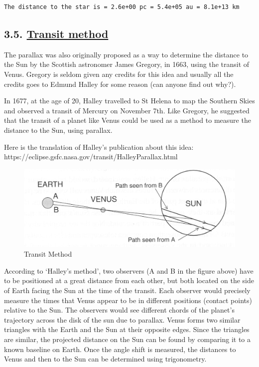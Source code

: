 \documentclass[
  letterpaper,
  DIV=11,
  numbers=noendperiod]{scrartcl}
\begin{document}
\begin{verbatim}
The distance to the star is = 2.6e+00 pc = 5.4e+05 au = 8.1e+13 km
\end{verbatim}

\hypertarget{transit-method}{%
\subsection{\texorpdfstring{3.5. \protect\hyperlink{toc0_}{Transit
method}}{3.5. Transit method}}\label{transit-method}}

The parallax was also originally proposed as a way to determine the
distance to the Sun by the Scottish astronomer James Gregory, in 1663,
using the transit of Venus. Gregory is seldom given any credits for this
idea and usually all the credits goes to Edmund Halley for some reason
(can anyone find out why?).

In 1677, at the age of 20, Halley travelled to St Helena to map the
Southern Skies and observed a transit of Mercury on November 7th. Like
Gregory, he suggested that the transit of a planet like Venus could be
used as a method to measure the distance to the Sun, using parallax.

Here is the translation of Halley's publication about this idea:
https://eclipse.gsfc.nasa.gov/transit/HalleyParallax.html

\begin{figure}

{\centering \includegraphics{img/TransitMethod.png}

}

\caption{Transit Method}

\end{figure}

According to `Halley's method', two observers (A and B in the figure
above) have to be positioned at a great distance from each other, but
both located on the side of Earth facing the Sun at the time of the
transit. Each observer would precisely measure the times that Venus
appear to be in different positions (contact points) relative to the
Sun. The observers would see different chords of the planet's trajectory
across the disk of the sun due to parallax. Venus forms two similar
triangles with the Earth and the Sun at their opposite edges. Since the
triangles are similar, the projected distance on the Sun can be found by
comparing it to a known baseline on Earth. Once the angle shift is
measured, the distances to Venus and then to the Sun can be determined
using trigonometry.
\end{document}
